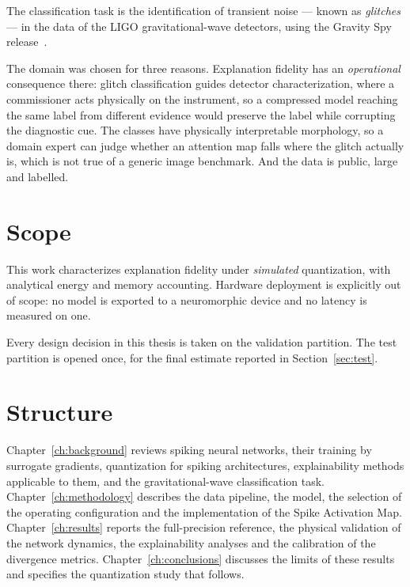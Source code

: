 The classification task is the identification of transient noise --- known as
\emph{glitches} --- in the data of the LIGO gravitational-wave detectors, using
the Gravity Spy release~\cite{zevin2017, glanzer2023, glanzer2021}.

The domain was chosen for three reasons. Explanation fidelity has an
\emph{operational} consequence there: glitch classification guides detector
characterization, where a commissioner acts physically on the instrument, so a
compressed model reaching the same label from different evidence would preserve
the label while corrupting the diagnostic cue. The classes have physically
interpretable morphology, so a domain expert can judge whether an attention map
falls where the glitch actually is, which is not true of a generic image
benchmark. And the data is public, large and labelled.

\section{Scope}

This work characterizes explanation fidelity under \emph{simulated}
quantization, with analytical energy and memory accounting. Hardware deployment
is explicitly out of scope: no model is exported to a neuromorphic device and no
latency is measured on one.

Every design decision in this thesis is taken on the validation partition. The
test partition is opened once, for the final estimate reported in
Section~\ref{sec:test}.

\section{Structure}

Chapter~\ref{ch:background} reviews spiking neural networks, their training by
surrogate gradients, quantization for spiking architectures, explainability
methods applicable to them, and the gravitational-wave classification task.
Chapter~\ref{ch:methodology} describes the data pipeline, the model, the
selection of the operating configuration and the implementation of the Spike
Activation Map. Chapter~\ref{ch:results} reports the full-precision reference,
the physical validation of the network dynamics, the explainability analyses and
the calibration of the divergence metrics. Chapter~\ref{ch:conclusions}
discusses the limits of these results and specifies the quantization study that
follows.
